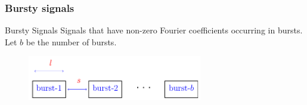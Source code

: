 \documentclass[10pt,xcolor=table]{beamer}
\begin{document}
	\begin{frame}\frametitle{Bursty signals}
		
		
		
		\begin{block}{Bursty Signals}
			Signals that have non-zero Fourier coefficients occurring in bursts. Let $b$ be the number of bursts.
		\end{block}
		
		\begin{figure}[t]
			\centering
			\includegraphics[width=3.0in]{./Figures/burst_spacing}
		\end{figure}
		
	\end{frame}
\end{document}
